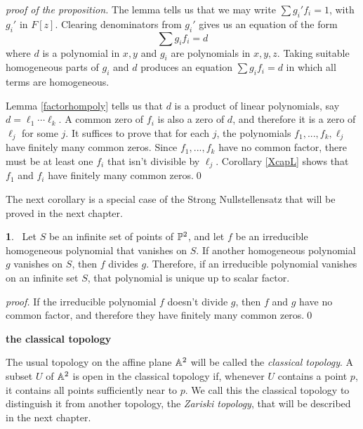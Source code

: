 \documentclass[leqno]{book}
\newcommand\Marginnote[1]{\marginnote{\hspace{-12pt}\normalfont{#1}}}
\renewcommand\theequation{\thesection.\arabic{equation}}
\newenvironment{boldequation}{\renewcommand\theequation{\textbf{\thesection.\arabic{equation}}}\equation}
   {\endequation}
\theoremstyle{definition}%
\numberwithin{equation}{section}
\theoremstyle{theorem} %
\newtheorem{corollary}[equation]{}
\renewenvironment{proof}{\no \emph{proof.}}{}
\begin{document}
\msno
{\it proof of the proposition.}  The lemma tells us that 
we may write $\sum g_i'f_i=1$, with $g_i'$ in $F[z]$.
Clearing denominators
from $g_i'$ gives us an equation of the form
$$\sum g_if_i=d$$ where $d$ is a polynomial in $x,y$ and $g_i$ are
polynomials in $x,y,z$.  Taking suitable homogeneous parts of $g_i$
and $d$ produces an equation $\sum g_if_i=d$ in which all terms are
homogeneous.   

Lemma \ref{factorhompoly} tells us that $d$ is a product of linear
polynomials, say $d=\ell_1\cdots \ell_k$.  A common zero of $f_i$ is
also a zero of $d$, and therefore it is a zero of $\ell_j$ for some
$j$.  It suffices to prove that for each $j$, the polynomials
$f_1,...,f_k,\ell_j$ have finitely many common zeros.  Since
$f_1,...,f_k$ have no common factor, there must be at least one $f_i$
that isn't divisible by $\ell_j$. Corollary \ref{XcapL} shows that
$f_1$ and $f_i$ have finitely many common zeros.\qed




\ms
The next corollary is a special case of the Strong Nullstellensatz
that will be proved in the next chapter.

\begin{corollary}{}\Marginnote{idealprincipal}\;\,
Let $S$ be an infinite set of points of $\mathbb{P}^2$, and let $f$ be an
irreducible homogeneous polynomial that vanishes on $S$.  If another
homogeneous polynomial $g$ vanishes on $S$, then $f$ divides $g$.
Therefore, if an irreducible polynomial vanishes on an infinite set
$S$, that polynomial is unique up to scalar factor.
\label{idealprincipal} \end{corollary}

\begin{proof} If the irreducible polynomial $f$ doesn't divide $g$,
then $f$ and $g$ have no common factor, and therefore they have 
finitely many common zeros.\qed\end{proof} 


\ms
\begin{boldequation}
\hspace{-9.0cm} \textbf{the classical  topology}
\label{classicaltopology}
 \Marginnote{classicaltopology}
 \end{boldequation}


 \msno The usual topology on the affine plane $\mathbb{A}^2$ will be called
 the {\it classical topology}.  A subset $U$ of $\mathbb{A}^2$ is open in
 the classical topology if, whenever $U$ contains a point $p$, it
 contains all points sufficiently near to $p$.  We call this the
 classical topology to distinguish it from another topology, 
 the {\it Zariski topology}, that will be described in the next chapter.
\end{document}
